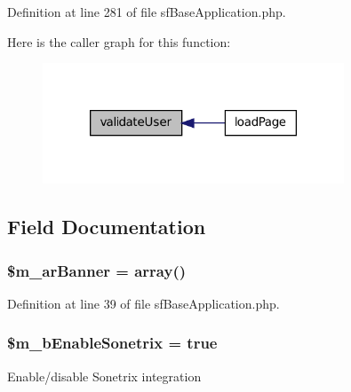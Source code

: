 Definition at line 281 of file sfBaseApplication.php.








Here is the caller graph for this function:\nopagebreak
\begin{figure}[H]
\begin{center}
\leavevmode
\includegraphics[width=254pt]{classSFApplication_a18a992b92ee5ff3ad60ec30d8e0cba60_icgraph}
\end{center}
\end{figure}




\subsection{Field Documentation}
\hypertarget{classSFApplication_a03606a66e78d358c6094f05f0857845d}{
\subsubsection[{\$m\_\-arBanner}]{\setlength{\rightskip}{0pt plus 5cm}\$m\_\-arBanner = {\bf array}()}}
\label{classSFApplication_a03606a66e78d358c6094f05f0857845d}


Definition at line 39 of file sfBaseApplication.php.

\hypertarget{classSFApplication_a55534a049a693ced372dba4331e5e9bd}{
\subsubsection[{\$m\_\-bEnableSonetrix}]{\setlength{\rightskip}{0pt plus 5cm}\$m\_\-bEnableSonetrix = true}}
\label{classSFApplication_a55534a049a693ced372dba4331e5e9bd}
Enable/disable Sonetrix integration 

